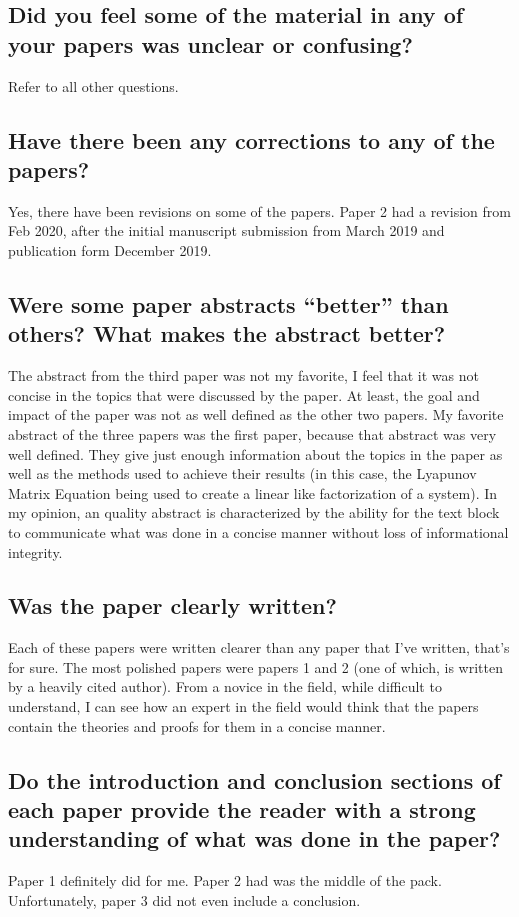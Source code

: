 \documentclass{IEEEtran}
\begin{document}
\subsection{Did you feel some of the material in any of your papers was unclear or confusing?}
Refer to all other questions.


\subsection{Have there been any corrections to any of the papers?}
Yes, there have been revisions on some of the papers. Paper 2 had a revision from Feb 2020, after the initial manuscript submission from March 2019 and publication form December 2019.

\subsection{Were some paper abstracts “better” than others? What makes the abstract better?}
The abstract from the third paper was not my favorite, I feel that it was not concise in the topics that were discussed by the paper. At least, the goal and impact of the paper was not as well defined as the other two papers. My favorite abstract of the three papers was the first paper, because that abstract was very well defined. They give just enough information about the topics in the paper as well as the methods used to achieve their results (in this case, the Lyapunov Matrix Equation being used to create a linear like factorization of a system). In my opinion, an quality abstract is characterized by the ability for the text block to communicate what was done in a concise manner without loss of informational integrity.


\subsection{Was the paper clearly written?}
Each of these papers were written clearer than any paper that I've written, that's for sure. The most polished papers were papers 1 and 2 (one of which, is written by a heavily cited author). From a novice in the field, while difficult to understand, I can see how an expert in the field would think that the papers contain the theories and proofs for them in a concise manner.


\subsection{Do the introduction and conclusion sections of each paper provide the reader with a strong understanding of what was done in the paper?}
Paper 1 definitely did for me. Paper 2 had was the middle of the pack. Unfortunately, paper 3 did not even include a conclusion.
\end{document}
